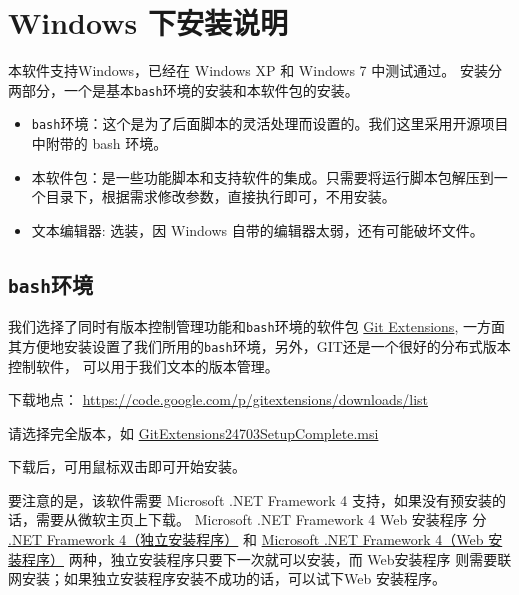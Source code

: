 \documentclass{article}
\begin{document}
\section{Windows 下安装说明}

本软件支持Windows，已经在 Windows XP 和 Windows 7 中测试通过。
安装分两部分，一个是基本\texttt{bash}环境的安装和本软件包的安装。

\begin{itemize}
  \item \texttt{bash}环境：这个是为了后面脚本的灵活处理而设置的。我们这里采用开源项目中附带的 bash 环境。
  \item 本软件包：是一些功能脚本和支持软件的集成。只需要将运行脚本包解压到一个目录下，根据需求修改参数，直接执行即可，不用安装。
  \item 文本编辑器: 选装，因 Windows 自带的编辑器太弱，还有可能破坏文件。
\end{itemize}



\subsection{\texttt{bash}环境}

我们选择了同时有版本控制管理功能和\texttt{bash}环境的软件包 \href{https://code.google.com/p/gitextensions/}{Git Extensions},
一方面其方便地安装设置了我们所用的\texttt{bash}环境，另外，GIT还是一个很好的分布式版本控制软件，
可以用于我们文本的版本管理。

下载地点： \url{https://code.google.com/p/gitextensions/downloads/list}

请选择完全版本，如 \href{https://code.google.com/p/gitextensions/downloads/detail?name=GitExtensions24703SetupComplete.msi&can=2&q=}{GitExtensions24703SetupComplete.msi}

下载后，可用鼠标双击即可开始安装。


要注意的是，该软件需要 Microsoft .NET Framework 4 支持，如果没有预安装的话，需要从微软主页上下载。
Microsoft .NET Framework 4 Web 安装程序 分 
\href{http://www.microsoft.com/zh-cn/download/details.aspx?id=22833}{.NET Framework 4（独立安装程序）}
和
\href{http://www.microsoft.com/zh-CN/download/details.aspx?id=17851}{Microsoft .NET Framework 4（Web 安装程序）}
两种，独立安装程序只要下一次就可以安装，而 Web安装程序 则需要联网安装；如果独立安装程序安装不成功的话，可以试下Web 安装程序。
\end{document}
